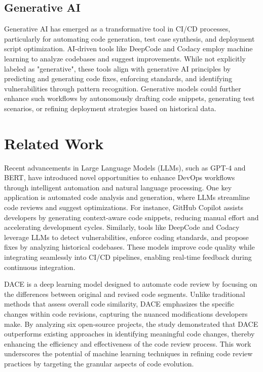 \documentclass[12pt]{article}
\begin{document}
\subsection{Generative AI}
Generative AI has emerged as a transformative tool in CI/CD processes, particularly for automating code generation, test case synthesis, and deployment script optimization. AI-driven tools like DeepCode and Codacy employ machine learning to analyze codebases and suggest improvements. While not explicitly labeled as "generative", these tools align with generative AI principles by predicting and generating code fixes, enforcing standards, and identifying vulnerabilities through pattern recognition. Generative models could further enhance such workflows by autonomously drafting code snippets, generating test scenarios, or refining deployment strategies based on historical data. \cite{AIDrivenDevops}

\section{Related Work}
Recent advancements in Large Language Models (LLMs), such as GPT-4 and BERT, have introduced novel opportunities to enhance DevOps workflows through intelligent automation and natural language processing. One key application is automated code analysis and generation, where LLMs streamline code reviews and suggest optimizations. For instance, GitHub Copilot assists developers by generating context-aware code snippets, reducing manual effort and accelerating development cycles. Similarly, tools like DeepCode and Codacy leverage LLMs to detect vulnerabilities, enforce coding standards, and propose fixes by analyzing historical codebases. These models improve code quality while integrating seamlessly into CI/CD pipelines, enabling real-time feedback during continuous integration. \cite{aiStreamlinedCICD}

DACE \cite{automaticCR} is a deep learning model designed to automate code review by focusing on the differences between original and revised code segments. Unlike traditional methods that assess overall code similarity, DACE emphasizes the specific changes within code revisions, capturing the nuanced modifications developers make. By analyzing six open-source projects, the study demonstrated that DACE outperforms existing approaches in identifying meaningful code changes, thereby enhancing the efficiency and effectiveness of the code review process. This work underscores the potential of machine learning techniques in refining code review practices by targeting the granular aspects of code evolution.
\end{document}
